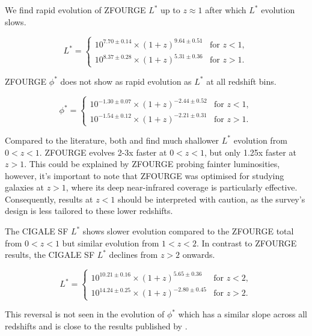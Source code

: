 We find rapid evolution of ZFOURGE $L^{*}$ up to $z\approx1$ after which $L^{*}$ evolution slows.

\begin{equation*}
    L^{*} =
    \begin{cases} 
        10^{7.70 \pm 0.14} \times (1+z)^{9.64 \pm 0.51} & \text{for } z < 1, \\
        10^{8.37 \pm 0.28} \times (1+z)^{5.31 \pm 0.36} & \text{for } z > 1.
    \end{cases}
\end{equation*}

ZFOURGE $\phi^{*}$ does not show as rapid evolution as $L^{*}$ at all redshift bins. 

\begin{equation*}
    \phi^{*} =
    \begin{cases} 
        10^{-1.30 \pm 0.07} \times (1+z)^{-2.44 \pm 0.52} & \text{for } z < 1, \\
        10^{-1.54 \pm 0.12} \times (1+z)^{-2.21 \pm 0.31} & \text{for } z > 1.
    \end{cases}
\end{equation*}

Compared to the literature, both \cite{gruppioni_herschel_2013} and \cite{magnelli_deepest_2013} find much shallower $L^{*}$ evolution from $0<z<1$. ZFOURGE evolves 2-3x faster at $0<z<1$, but only 1.25x faster at $z>1$. This could be explained by ZFOURGE probing fainter luminosities, however, it’s important to note that ZFOURGE was optimised for studying galaxies at $z>1$, where its deep near-infrared coverage is particularly effective. Consequently, results at $z<1$ should be interpreted with caution, as the survey’s design is less tailored to these lower redshifts. 

The CIGALE SF $L^{*}$ shows slower evolution compared to the ZFOURGE total from $0<z<1$ but similar evolution from $1<z<2$. In contrast to ZFOURGE results, the CIGALE SF $L^{*}$ declines from $z>2$ onwards. 

\begin{equation*}
    L^{*} =
    \begin{cases} 
        10^{10.21 \pm 0.16} \times (1+z)^{5.65 \pm 0.36} & \text{for } z < 2, \\
        10^{14.24 \pm 0.25} \times (1+z)^{-2.80 \pm 0.45} & \text{for } z > 2.
    \end{cases}
\end{equation*}

This reversal is not seen in the evolution of $\phi^{*}$ which has a similar slope across all redshifts and is close to the results published by \cite{magnelli_deepest_2013}. 

